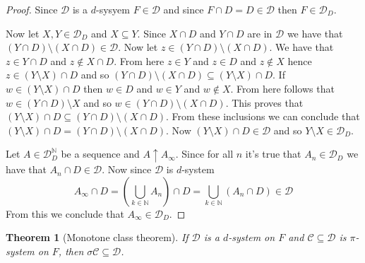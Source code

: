 \documentclass[a4paper]{amsart}
\newtheorem{thm}{Theorem}
\newcommand{\NN}{\mathbb{N}}
\newcommand{\convg}{\uparrow}
\begin{document}
\begin{proof}
    Since $\mathcal{D}$ is a $d$-sysyem 
    $F \in \mathcal{D}$ and since $F \cap D = D \in \mathcal{D}$ 
    then $F \in \mathcal{D}_D$. 
    
    Now let $X,Y \in \mathcal{D}_D$ and $X \subseteq Y$.
    Since $X \cap D$ and $Y \cap D$ are in $\mathcal{D}$ we 
    have that 
    $ \left(Y \cap D\right) \setminus \left(X \cap D\right) \in \mathcal{D}$. 
    Now let $z \in  \left(Y \cap D\right) \setminus \left(X \cap D\right)$. 
    We have that $z \in Y \cap D$ and $z \notin X \cap D$. 
    From here $z \in Y$ and $z \in D$ and $z \notin X$ hence 
    $z \in \left(Y \setminus X\right) \cap D$ and so
    $
    \left(Y\cap D\right) \setminus \left(X\cap D\right) \subseteq  \left(Y \setminus X\right) \cap D
    $. If $w \in \left(Y \setminus X\right) \cap D $ then 
    $w \in D$ and $w \in Y$ and $w \notin X$. From here 
    follows that $w \in \left(Y \cap D\right) \setminus X$
    and so $w  \in \left(Y \cap D\right) \setminus \left(X \cap D \right)$.
    This proves that $ \left(Y \setminus X\right) \cap D  \subseteq\left(Y \cap D\right) \setminus \left(X \cap D \right)$.
    From these inclusions we can conclude that 
    $\left(Y \setminus X\right) \cap D  = \left(Y \cap D\right) \setminus \left(X \cap D \right)$.
    Now $\left(Y \setminus X\right) \cap D  \in \mathcal{D}$ and so $Y \setminus X \in \mathcal{D}_D$.
    
    Let $A \in \mathcal{D}_D^\NN$ be a sequence and $A \convg A_\infty$.
    Since for all $n$ it's true that $A_n \in \mathcal{D}_D$ we have that $A_n \cap D \in \mathcal{D}$.
    Now since $\mathcal{D}$ is $d$-system 
    $$ A_\infty \cap D = \left(\bigcup\limits_{k \in \NN} A_n\right) \cap D = \bigcup\limits_{k \in \NN} \left(A_n \cap D\right) \in \mathcal{D}$$
    From this we conclude that $A_\infty \in \mathcal{D}_D$.
\end{proof}


\begin{thm}[Monotone class theorem]
    If $\mathcal{D}$ is a $d$-system on $F$ and $\mathcal{C}\subseteq \mathcal{D}$
    is $\pi$-system on $F$, then $\sigma\mathcal{C} \subseteq \mathcal{D}$.
\end{thm}
\end{document}
